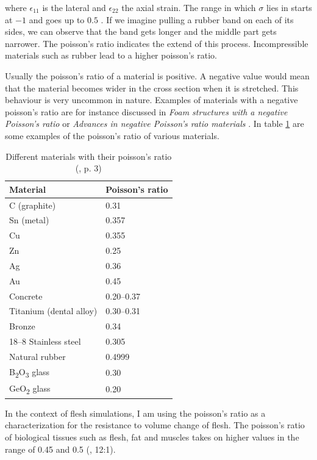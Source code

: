 where $\epsilon_{11}$ is the lateral and $\epsilon_{22}$ the axial strain. The range in which $\sigma$ lies in starts at $-1$ and goes up to $0.5$ \cite{PhysRevB.80.132104}. If we imagine pulling a rubber band on each of its sides, we can observe that the band gets longer and the middle part gets narrower. The poisson's ratio indicates the extend of this process. Incompressible materials such as rubber lead to a higher poisson's ratio.

Usually the poisson's ratio of a material is positive. A negative value would mean that the material becomes wider in the cross section when it is stretched. This behaviour is very uncommon in nature. Examples of materials with a negative poisson's ratio are for instance discussed in \textit{Foam structures with a negative Poisson's ratio} \cite{lakes1987foam} or \textit{Advances in negative Poisson's ratio materials} \cite{lakes1993advances}. In table \ref{table:1} are some examples of the poisson's ratio of various materials.

\begin{table}[!htbp]
\centering
    \begin{tabular}{ | l | l |}
    \hline
    \textbf{Material} & \textbf{Poisson's ratio} \\ \hline
    C (graphite) & 0.31 \\ \hline
    Sn (metal) & 0.357 \\ \hline
    Cu & 0.355 \\ \hline
    Zn & 0.25 \\ \hline
    Ag & 0.36 \\ \hline
    Au & 0.45 \\ \hline
    Concrete & 0.20–0.37 \\ \hline
    Titanium (dental alloy) & 0.30–0.31 \\ \hline
    Bronze & 0.34 \\ \hline
    18–8 Stainless steel & 0.305 \\ \hline
    Natural rubber & 0.4999 \\ \hline
	B\textsubscript{2}O\textsubscript{3} glass & 0.30 \\ \hline
	GeO\textsubscript{2} glass & 0.20 \\ \hline	
    \end{tabular}
    \caption[Materials with their poisson's ratio]{Different materials with their poisson's ratio (\cite{PhysRevB.80.132104}, p. 3)}
\label{table:1}
\end{table}

In the context of flesh simulations, I am using the poisson's ratio as a characterization for the resistance to volume change of flesh. The poisson's ratio of biological tissues such as flesh, fat and muscles takes on higher values in the range of 0.45 and 0.5 (\cite{Smith:2018:SNF:3191713.3180491}, 12:1).

